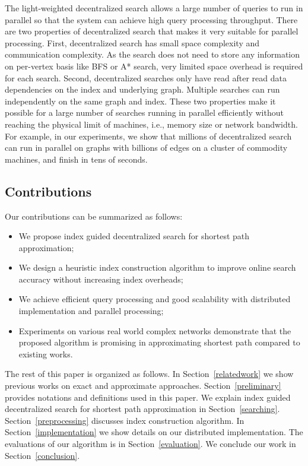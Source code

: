 The light-weighted decentralized search allows a large number of queries to run in parallel so that the system can achieve high query processing throughput. There are two properties of decentralized search that makes it very suitable for parallel processing. First, decentralized search has small space complexity and communication complexity. As the search does not need to store any information on per-vertex basis like BFS or A* search, very limited space overhead is required for each search. Second, decentralized searches only have read after read data dependencies on the index and underlying graph. Multiple searches can run independently on the same graph and index. These two properties make it possible for a large number of searches running in parallel efficiently without reaching the physical limit of machines, i.e., memory size or network bandwidth. For example, in our experiments, we show that millions of decentralized search can run in parallel on graphs with billions of edges on a cluster of commodity machines, and finish in tens of seconds. 

\subsection{Contributions}
Our contributions can be summarized as follows:

\begin{itemize}
	\item We propose index guided decentralized search for shortest path approximation;
	\item We design a heuristic index construction algorithm to improve online search accuracy without increasing index overheads;
	\item We achieve efficient query processing and good scalability with distributed implementation and parallel processing;
	\item Experiments on various real world complex networks demonstrate that the proposed algorithm is promising in approximating shortest path compared to existing works.
\end{itemize}

The rest of this paper is organized as follows. In Section~\ref{relatedwork} we show previous works on exact and approximate approaches. Section~\ref{preliminary} provides notations and definitions used in this paper. We explain index guided decentralized search for shortest path approximation in Section~\ref{searching}. Section~\ref{preprocessing} discusses index construction algorithm. In Section~\ref{implementation} we show details on our distributed implementation. The evaluations of our algorithm is in Section~\ref{evaluation}. We conclude our work in Section~\ref{conclusion}.
